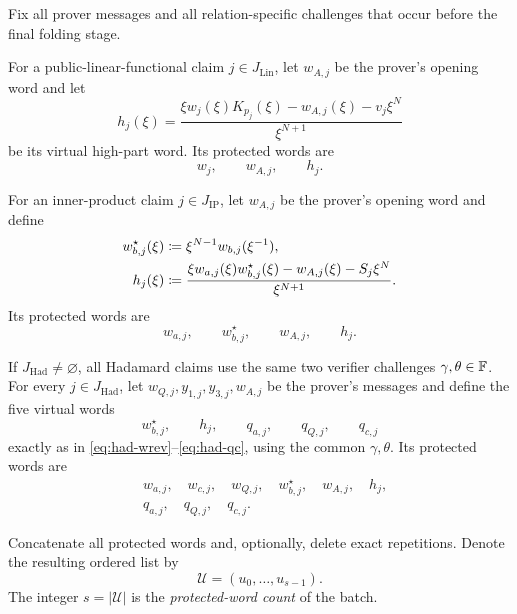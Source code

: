 \begin{definition}
\label{def:protected-component-list}
Fix all prover messages and all relation-specific challenges that occur before the final folding stage.

For a public-linear-functional claim $j\in J_{\mathrm{Lin}}$, let $w_{A,j}$ be the prover's opening word and let
\[
  h_j(\xi)
  =\frac{\xi w_j(\xi)K_{p_j}(\xi)-w_{A,j}(\xi)-v_j\xi^N}{\xi^{N+1}}
\]
be its virtual high-part word.  Its protected words are
\begin{equation}
  w_j,\qquad w_{A,j},\qquad h_j.
  \label{eq:lin-protected-words}
\end{equation}

For an inner-product claim $j\in J_{\mathrm{IP}}$, let $w_{A,j}$ be the prover's opening word and define
\begin{align}
  w_{b,j}^{\star}(\xi)
    &\coloneqq \xi^{N-1}w_{b,j}(\xi^{-1}),
  \\
  h_j(\xi)
    &\coloneqq
    \frac{\xi w_{a,j}(\xi)w_{b,j}^{\star}(\xi)-w_{A,j}(\xi)-S_j\xi^N}{\xi^{N+1}}.
\end{align}
Its protected words are
\begin{equation}
  w_{a,j},\qquad w_{b,j}^{\star},\qquad w_{A,j},\qquad h_j.
  \label{eq:ip-protected-words}
\end{equation}

If $J_{\mathrm{Had}}\ne\varnothing$, all Hadamard claims use the same two verifier challenges $\gamma,\theta\in\mathbb{F}$.  For every $j\in J_{\mathrm{Had}}$, let $w_{Q,j},y_{1,j},y_{3,j},w_{A,j}$ be the prover's messages and define the five virtual words
\[
  w_{b,j}^{\star},\qquad
  h_j,\qquad
  q_{a,j},\qquad
  q_{Q,j},\qquad
  q_{c,j}
\]
exactly as in \eqref{eq:had-wrev}--\eqref{eq:had-qc}, using the common $\gamma,\theta$.  Its protected words are
\begin{equation}
\begin{split}
  &w_{a,j},\quad w_{c,j},\quad w_{Q,j},\quad w_{b,j}^{\star},\quad
  w_{A,j},\quad h_j,\\
  &q_{a,j},\quad q_{Q,j},\quad q_{c,j}.
\end{split}
\label{eq:had-protected-words}
\end{equation}

Concatenate all protected words and, optionally, delete exact repetitions.  Denote the resulting ordered list by
\begin{equation}
  \mathcal U=(u_0,\ldots,u_{s-1}).
  \label{eq:protected-list}
\end{equation}
The integer $s=|\mathcal U|$ is the \emph{protected-word count} of the batch.
\end{definition}

